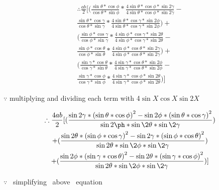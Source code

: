 \documentclass[journal,12pt,twocolumn]{IEEEtran}
\begin{document}
\begin{multline*}
\therefore \frac{ab}{2}[
    (\frac{\sin\theta*\cos\phi}{\cos\theta*\sin\phi}*\frac{4\sin\theta*\cos\phi*\sin2\gamma}{4\sin\theta*\cos\phi*\sin2\gamma}-\\ \frac{\sin\theta*\cos\gamma}{\cos\theta*\sin\gamma}*\frac{4\sin\theta*\cos\gamma*\sin2\phi}{4\sin\theta*\cos\gamma*\sin2\phi}) +\\
    (\frac{\sin\phi*\cos\gamma}{\cos\phi*\sin\gamma}*\frac{4\sin\phi*\cos\gamma*\sin2\theta}{4\sin\phi*\cos\gamma*\sin2\theta}-\\\frac{\sin\phi*\cos\theta}{\cos\phi*\sin\theta}*\frac{4\sin\phi*\cos\theta*\sin2\gamma}{4\sin\phi*\cos\theta*\sin2\gamma})+\\
    (\frac{\sin\gamma*\cos\theta}{\cos\gamma*\sin\theta}*\frac{4\sin\gamma*\cos\theta*\sin2\phi}{4\sin\gamma*\cos\theta*\sin2\phi}-\\\frac{\sin\gamma*\cos\phi}{\cos\gamma*\sin\phi}*\frac{4\sin\gamma*\cos\phi*\sin2\theta}{4\sin\gamma*\cos\phi*\sin2\theta})
    ]
\end{multline*}
\begin{flushright}
$\because$ multiplying and  dividing each term with 4$\sin X \cos X \sin2X$
\end{flushright}
\vspace{0.8cm}
\begin{multline*}
        \therefore \frac{4ab}{2}[ 
        (\frac{\sin2\gamma* \left( \sin\theta*\cos\phi \right)^2 -\sin2\phi* \left( \sin\theta*\cos\gamma \right)^2 }{\sin2\ph*\sin\2\theta*\sin\2\gamma}) \\ +
        (\frac{\sin2\theta* \left( \sin\phi*\cos\gamma \right)^2 -\sin2\gamma* \left( \sin\phi*\cos\theta \right)^2 }{\sin2\theta*\sin\2\phi*\sin\2\gamma} )\\ +
        (\frac{\sin2\phi* \left( \sin\gamma*\cos\theta \right)^2 -\sin2\theta* \left( \sin\gamma*\cos\phi \right)^2 }{\sin2\theta*\sin\2\phi*\sin\2\gamma} )
        ] 
\end{multline*}
\begin{flushright}
$\because$ ~simplifying ~above ~equation
\end{flushright}

\vspace{0.8cm}
\end{document}
